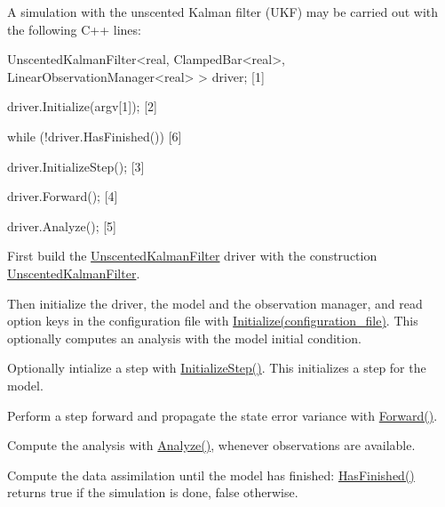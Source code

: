\documentclass{tufte-book}
\begin{document}
\-A simulation with the unscented \-Kalman filter (\-U\-K\-F) may be carried out with the following \-C++ lines\-:

 \begin{frame_cpp}
UnscentedKalmanFilter<real, ClampedBar<real>,
        LinearObservationManager<real> > driver; [1]

driver.Initialize(argv[1]); [2]

while (!driver.HasFinished()) [6]
{
    driver.InitializeStep(); [3]

    driver.Forward(); [4]

    driver.Analyze(); [5]
}
\end{frame_cpp}





\begin{DoxyEnumerate}
\item \-First build the {\ttfamily  \hyperlink{class_verdandi_1_1_unscented_kalman_filter}{\-Unscented\-Kalman\-Filter}} driver with the construction {\ttfamily  \hyperlink{class_verdandi_1_1_unscented_kalman_filter_ab48260d24d6656b0b8b9b408c226e09d}{\-Unscented\-Kalman\-Filter}}.


\item \-Then initialize the driver, the model and the observation manager, and read option keys in the configuration file with {\ttfamily  \hyperlink{class_verdandi_1_1_unscented_kalman_filter_a75803b63310250aa37b54128b714c810}{\-Initialize(configuration\-\_\-file)}}. \-This optionally computes an analysis with the model initial condition.


\item \-Optionally intialize a step with {\ttfamily  \hyperlink{class_verdandi_1_1_unscented_kalman_filter_a150b6e3f2d8fe7627ecd47047dd05c61}{\-Initialize\-Step()}}. \-This initializes a step for the model.


\item \-Perform a step forward and propagate the state error variance with {\ttfamily  \hyperlink{class_verdandi_1_1_unscented_kalman_filter_a7dfa54bcedf8d0ea26c93ad0bb2d6293}{\-Forward()}}.


\item \-Compute the analysis with {\ttfamily  \hyperlink{class_verdandi_1_1_unscented_kalman_filter_a0f87ca7e67c3165f040b97dbbd87bb45}{\-Analyze()}}, whenever observations are available.


\item \-Compute the data assimilation until the model has finished\-: {\ttfamily  \hyperlink{class_verdandi_1_1_unscented_kalman_filter_a024094116ae425381344e129208c3e74}{\-Has\-Finished()}} returns true if the simulation is done, false otherwise.
\end{DoxyEnumerate}
\end{document}
